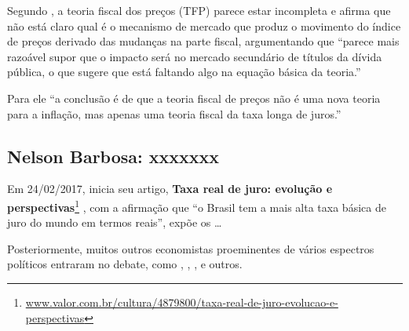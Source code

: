 \documentclass[]{article}
\let\rmarkdownfootnote\footnote%
\def\footnote{\protect\rmarkdownfootnote}
\begin{document}
Segundo  , a teoria fiscal dos preços (TFP)
parece estar incompleta e afirma que não está claro qual é o mecanismo
de mercado que produz o movimento do índice de preços derivado das
mudanças na parte fiscal, argumentando que ``parece mais razoável supor
que o impacto será no mercado secundário de títulos da dívida pública, o
que sugere que está faltando algo na equação básica da teoria.''

Para ele ``a conclusão é de que a teoria fiscal de preços não é uma nova
teoria para a inflação, mas apenas uma teoria fiscal da taxa longa de
juros.''

\subsection{Nelson Barbosa: xxxxxxx}\label{nelson-barbosa-xxxxxxx}

Em 24/02/2017,  inicia seu artigo,
\textbf{Taxa real de juro: evolução e perspectivas}\footnote{\href{http://www.valor.com.br/cultura/4879800/taxa-real-de-juro-evolucao-e-perspectivas}{www.valor.com.br/cultura/4879800/taxa-real-de-juro-evolucao-e-perspectivas}}
\cite{barbosa}, com a afirmação que ``o Brasil tem a mais alta taxa
básica de juro do mundo em termos reais'', expõe os \ldots{}

Posteriormente, muitos outros economistas proeminentes de vários
espectros políticos entraram no debate, como ,
, ,
 e outros.
\end{document}
